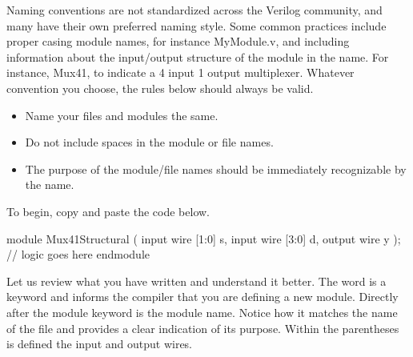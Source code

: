 \documentclass[12pt]{labmanual}
\begin{document}
\begin{extra}
    Naming conventions are not standardized across the Verilog community, and many have their own preferred naming style. Some common practices include proper casing module names, for instance MyModule.v, and including information about the input/output structure of the module in the name. For instance, Mux41, to indicate a 4 input 1 output multiplexer. Whatever convention you choose, the rules below should always be valid.
\begin{itemize}
    \item Name your files and modules the same.
    \item Do not include spaces in the module or file names.
    \item The purpose of the module/file names should be immediately recognizable by the name.
\end{itemize}
\end{extra}

To begin, copy and paste the code below.

\begin{codeblock}[language=Verilog]
module Mux41Structural (
    input wire [1:0] s, 
    input wire [3:0] d,
    output wire y
);
    // logic goes here
endmodule
\end{codeblock}


Let us review what you have written and understand it better. The word  is a keyword and informs the compiler that you are defining a new module. Directly after the module keyword is the module name. Notice how it matches the name of the file and provides a clear indication of its purpose.
Within the parentheses is defined the input and output wires. 
\end{document}
